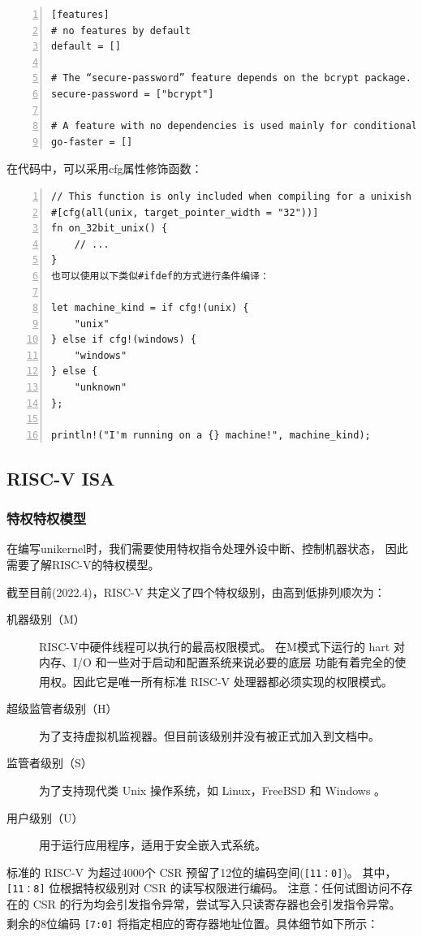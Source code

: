 \documentclass[UTF8,fontset=none,linespread=1.15]{ctexart}
\let\nosupcite\cite
\renewcommand*{\cite}[1]{\textsuperscript{\nosupcite{#1}}}
\begin{document}
\begin{lstlisting}[numbers=left]
[features]
# no features by default
default = []

# The “secure-password” feature depends on the bcrypt package.
secure-password = ["bcrypt"]

# A feature with no dependencies is used mainly for conditional 	 compilation, like `#[cfg(feature = "go-faster")]`.
go-faster = []
\end{lstlisting}

在代码中，可以采用cfg属性修饰函数：
\begin{lstlisting}[numbers=left]
// This function is only included when compiling for a unixish OS with a 32-bit architecture
#[cfg(all(unix, target_pointer_width = "32"))]
fn on_32bit_unix() {
	// ...
}
也可以使用以下类似#ifdef的方式进行条件编译：

let machine_kind = if cfg!(unix) {
	"unix"
} else if cfg!(windows) {
	"windows"
} else {
	"unknown"
};

println!("I'm running on a {} machine!", machine_kind);
\end{lstlisting}
\cite{e}

\subsection{RISC-V ISA}
\subsubsection{特权特权模型}
在编写unikernel时，我们需要使用特权指令处理外设中断、控制机器状态，
因此需要了解RISC-V的特权模型。

截至目前(2022.4)，RISC-V 共定义了四个特权级别，由高到低排列顺次为：

\begin{description}
\item[机器级别（M）] RISC-V中硬件线程可以执行的最高权限模式。
在M模式下运行的 hart 对内存、I/O 和一些对于启动和配置系统来说必要的底层
功能有着完全的使用权。因此它是唯一所有标准 RISC-V 处理器都必须实现的权限模式。\cite{a}
\item[超级监管者级别（H）] 为了支持虚拟机监视器。但目前该级别并没有被正式加入到文档中。
\item[监管者级别（S）] 为了支持现代类 Unix 操作系统，如 Linux，FreeBSD 和 Windows 。
\item[用户级别（U）] 用于运行应用程序，适用于安全嵌入式系统。
\end{description}

标准的 RISC-V 为超过4000个 CSR 预留了12位的编码空间(\texttt{[11：0]})。
其中，\texttt{[11：8]} 位根据特权级别对 CSR 的读写权限进行编码。
注意：任何试图访问不存在的 CSR 的行为均会引发指令异常，尝试写入只读寄存器也会引发指令异常。
剩余的8位编码 \texttt{[7:0]} 将指定相应的寄存器地址位置。具体细节如下所示：\cite{b}\cite{c}
\end{document}
